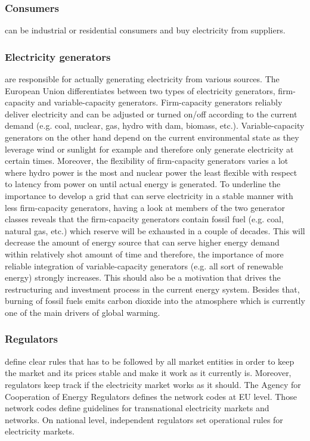 \documentclass[runningheads]{llncs}
\begin{document}
\subsubsection{Consumers} can be industrial or residential consumers and buy electricity from suppliers.

\subsubsection{Electricity generators} are responsible for actually generating electricity from various sources. The European Union differentiates between two types of electricity generators, firm-capacity and variable-capacity generators. Firm-capacity generators reliably deliver electricity and can be adjusted or turned on/off according to the current demand (e.g. coal, nuclear, gas, hydro with dam, biomass, etc.). Variable-capacity generators on the other hand depend on the current environmental state as they leverage wind or sunlight for example and therefore only generate electricity at certain times.  Moreover, the flexibility of firm-capacity generators varies a lot where hydro power is the most and nuclear power the least flexible with respect to latency from power on until actual energy is generated.
To underline the importance to develop a grid that can serve electricity in a stable manner with less firm-capacity generators, having a look at members of the two generator classes reveals that the firm-capacity generators contain fossil fuel (e.g. coal, natural gas, etc.) which reserve will be exhausted in a couple of decades. This will decrease the amount of energy source that can serve higher energy demand within relatively shot amount of time and therefore, the importance of more reliable integration of variable-capacity generators (e.g. all sort of renewable energy) strongly increases. This should also be a motivation that drives the restructuring and investment process in the current energy system. Besides that, burning of fossil fuels emits carbon dioxide into the atmosphere which is currently one of the main drivers of global warming. \cite{eu_energy_market}

\subsubsection{Regulators} define clear rules that has to be followed by all market entities in order to keep the market and its prices stable and make it work as it currently is. Moreover, regulators keep track if the electricity market works as it should. The Agency for Cooperation of Energy Regulators defines the network codes at EU level. Those network codes define guidelines for transnational electricity markets and networks. On national level, independent regulators set operational rules for electricity markets.
\end{document}
